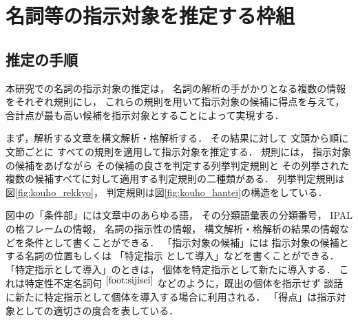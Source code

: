 \section{名詞等の指示対象を推定する枠組}

\begin{figure}[t]
  \leavevmode
  \begin{center}
  \end{center}
\end{figure}

\begin{figure}[t]
  \leavevmode
  \begin{center}
  \end{center}
\end{figure}


\subsection{推定の手順}
\label{wakugumi}

本研究での名詞の指示対象の推定は，
名詞の解析の手がかりとなる複数の情報をそれぞれ規則にし，
これらの規則を用いて指示対象の候補に得点を与えて，
合計点が最も高い候補を指示対象とすることによって実現する．

まず，解析する文章を構文解析・格解析する\cite{csan2_ieice}．
その結果に対して
文頭から順に文節ごとに
すべての規則を適用して指示対象を推定する．
規則には，
指示対象の候補をあげながら
その候補の良さを判定する列挙判定規則と
その列挙された複数の候補すべてに対して適用する判定規則の二種類がある．
列挙判定規則は図\ref{fig:kouho_rekkyo}，
判定規則は図\ref{fig:kouho_hantei}の構造をしている．

図中の「条件部」には文章中のあらゆる語，
その分類語彙表\cite{bgh}の分類番号，
IPALの格フレーム\cite{ipal}の情報，
名詞の指示性の情報，
構文解析・格解析の結果の情報などを条件として書くことができる．
「指示対象の候補」には
指示対象の候補とする名詞の位置もしくは
「特定指示
として導入」などを書くことができる．
「特定指示として導入」のときは，
個体を特定指示として新たに導入する．
これは特定性不定名詞句
$^{\ref{foot:sijisei}}$
などのように，既出の個体を指示せず
談話に新たに特定指示として個体を導入する場合に利用される．
「得点」は指示対象としての適切さの度合を表している．

